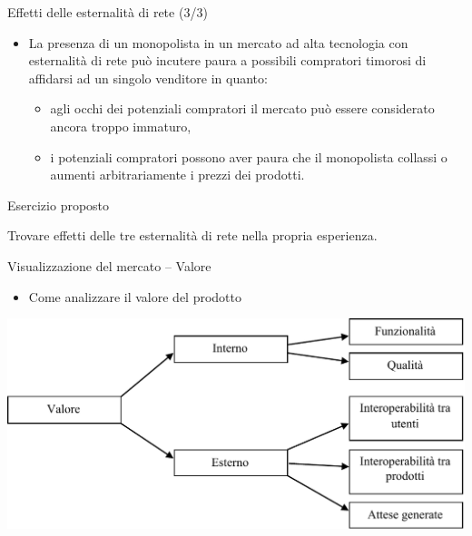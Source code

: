 \documentclass{beamer}
\begin{document}
\begin{frame}
{\centerline{Effetti delle esternalit\`{a} di rete (3/3)}}

\begin{itemize}

\item La presenza di un monopolista in un mercato ad alta tecnologia con esternalit\`{a} di rete pu\`{o} incutere paura a possibili compratori timorosi di affidarsi ad un singolo venditore in quanto:
\begin{itemize}
\item agli occhi dei potenziali compratori il mercato pu\`{o} essere considerato ancora troppo immaturo,
\item i potenziali compratori possono aver paura che il monopolista collassi o aumenti arbitrariamente i prezzi dei prodotti.
\end{itemize}

\end{itemize}

\end{frame}


\begin{frame}
{\centerline{Esercizio proposto}}
\vspace{1cm}
\begin{center}
    \LARGE{Trovare effetti delle tre esternalit\`{a} di rete nella propria esperienza.}
\end{center}

\end{frame}

\begin{frame}
{\centerline{Visualizzazione del mercato -- Valore}}
\begin{itemize}
    \item Come analizzare il valore del prodotto
\end{itemize} 
\begin{center}
    \includegraphics[width=\textwidth]{A2023.IDSEPC.ConcettoDiSoftware/ValoreDelProdotto.pdf}
\end{center}

\end{frame}
\end{document}
